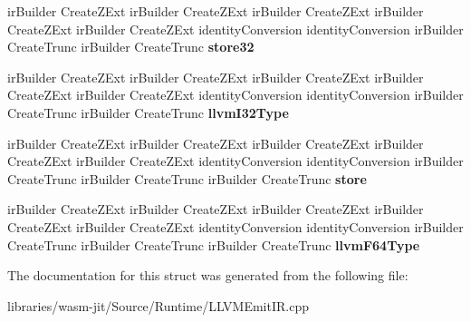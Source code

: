 \begin{DoxyCompactItemize}
\item 
\mbox{\label{struct_l_l_v_m_j_i_t_1_1_emit_function_context_a1a2be0ad964bb1870af4836d2d13f57e}} 
ir\+Builder Create\+Z\+Ext ir\+Builder Create\+Z\+Ext ir\+Builder Create\+Z\+Ext ir\+Builder Create\+Z\+Ext ir\+Builder Create\+Z\+Ext identity\+Conversion identity\+Conversion ir\+Builder Create\+Trunc ir\+Builder Create\+Trunc {\bfseries store32}
\item 
\mbox{\label{struct_l_l_v_m_j_i_t_1_1_emit_function_context_a776a0dde25fdef93d5ece09804bb8d60}} 
ir\+Builder Create\+Z\+Ext ir\+Builder Create\+Z\+Ext ir\+Builder Create\+Z\+Ext ir\+Builder Create\+Z\+Ext ir\+Builder Create\+Z\+Ext identity\+Conversion identity\+Conversion ir\+Builder Create\+Trunc ir\+Builder Create\+Trunc {\bfseries llvm\+I32\+Type}
\item 
\mbox{\label{struct_l_l_v_m_j_i_t_1_1_emit_function_context_a45831f25267806e651192e8323a9c817}} 
ir\+Builder Create\+Z\+Ext ir\+Builder Create\+Z\+Ext ir\+Builder Create\+Z\+Ext ir\+Builder Create\+Z\+Ext ir\+Builder Create\+Z\+Ext identity\+Conversion identity\+Conversion ir\+Builder Create\+Trunc ir\+Builder Create\+Trunc ir\+Builder Create\+Trunc {\bfseries store}
\item 
\mbox{\label{struct_l_l_v_m_j_i_t_1_1_emit_function_context_a5d70f50db40e1914a2f14d49c4c8e5aa}} 
ir\+Builder Create\+Z\+Ext ir\+Builder Create\+Z\+Ext ir\+Builder Create\+Z\+Ext ir\+Builder Create\+Z\+Ext ir\+Builder Create\+Z\+Ext identity\+Conversion identity\+Conversion ir\+Builder Create\+Trunc ir\+Builder Create\+Trunc ir\+Builder Create\+Trunc {\bfseries llvm\+F64\+Type}
\end{DoxyCompactItemize}


The documentation for this struct was generated from the following file\+:\begin{DoxyCompactItemize}
\item 
libraries/wasm-\/jit/\+Source/\+Runtime/L\+L\+V\+M\+Emit\+I\+R.\+cpp\end{DoxyCompactItemize}
